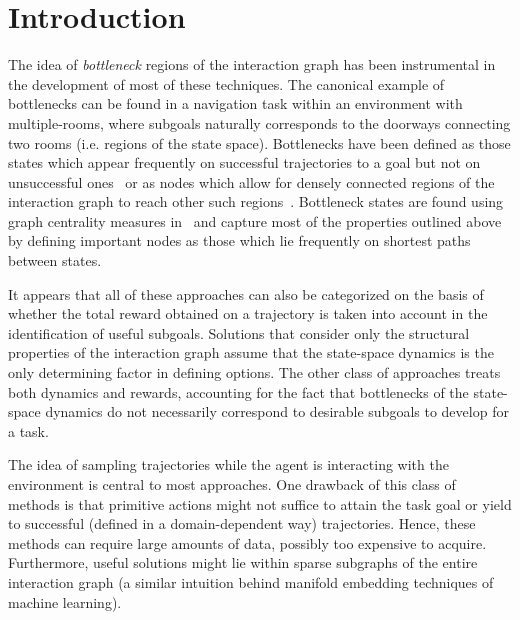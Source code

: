 \documentclass[12pt, oneside, extrafontsizes]{memoir}  %
\theoremstyle{plain}
\theoremstyle{definition}
\begin{document}
\clearpage
{}
\chapter{Introduction}

The idea of \textit{bottleneck}
regions of the interaction graph has been instrumental in the
development of most of these techniques.
The canonical example of bottlenecks can be found in a navigation
task within an environment with multiple-rooms, where subgoals naturally
corresponds to the doorways connecting two rooms (i.e. regions of the state
space). Bottlenecks have been defined as those states which
appear frequently on successful trajectories to a goal but not on
unsuccessful ones~\cite{Mcgovern2001, Stolle2002} or as nodes which
allow for densely connected regions of the interaction graph to
reach other such regions~\cite{Menache2002, Wolfe2005, Kazemitabar2009}.
Bottleneck states are found using graph centrality measures in~\cite{Barto2009, Rad2010} and capture most of the properties outlined
above by defining important nodes as those which lie frequently on
shortest paths between states.

It appears that all of these approaches can also be categorized on
the basis of whether the total reward obtained on a trajectory is
taken into account in the identification of useful subgoals. Solutions that consider only the structural
properties of the interaction graph assume that the state-space
dynamics is the only determining factor in defining options. The other class of approaches treats both dynamics and rewards, accounting for the fact that bottlenecks of
the state-space dynamics do not necessarily correspond to desirable
subgoals to develop for a task.

The idea of sampling trajectories while the agent is interacting
with the environment is central to most approaches. One drawback of this
class of methods is that primitive actions might not suffice to
attain the task goal or yield to successful (defined in a
domain-dependent way) trajectories. Hence, these methods can require large
amounts of data, possibly too expensive to acquire.
Furthermore, useful solutions might
 lie within sparse subgraphs of the entire interaction
graph (a similar intuition behind manifold embedding techniques of
machine learning).
\end{document}
